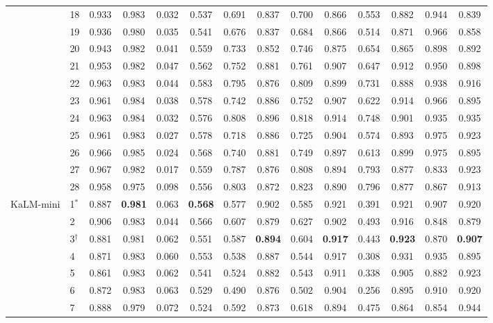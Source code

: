 \begin{table}[p]
\begin{tabular}{llcccccccccccc}
 & 18 & 0.933 & 0.983 & 0.032 & 0.537 & 0.691 & 0.837 & 0.700 & 0.866 & 0.553 & 0.882 & 0.944 & 0.839 \\
 & 19 & 0.936 & 0.980 & 0.035 & 0.541 & 0.676 & 0.837 & 0.684 & 0.866 & 0.514 & 0.871 & 0.966 & 0.858 \\
 & 20 & 0.943 & 0.982 & 0.041 & 0.559 & 0.733 & 0.852 & 0.746 & 0.875 & 0.654 & 0.865 & 0.898 & 0.892 \\
 & 21 & 0.953 & 0.982 & 0.047 & 0.562 & 0.752 & 0.881 & 0.761 & 0.907 & 0.647 & 0.912 & 0.950 & 0.898 \\
 & 22 & 0.963 & 0.983 & 0.044 & 0.583 & 0.795 & 0.876 & 0.809 & 0.899 & 0.731 & 0.888 & 0.938 & 0.916 \\
 & 23 & 0.961 & 0.984 & 0.038 & 0.578 & 0.742 & 0.886 & 0.752 & 0.907 & 0.622 & 0.914 & 0.966 & 0.895 \\
 & 24 & 0.963 & 0.984 & 0.032 & 0.576 & 0.808 & 0.896 & 0.818 & 0.914 & 0.748 & 0.901 & 0.935 & 0.935 \\
 & 25 & 0.961 & 0.983 & 0.027 & 0.578 & 0.718 & 0.886 & 0.725 & 0.904 & 0.574 & 0.893 & 0.975 & 0.923 \\
 & 26 & 0.966 & 0.985 & 0.024 & 0.568 & 0.740 & 0.881 & 0.749 & 0.897 & 0.613 & 0.899 & 0.975 & 0.895 \\
 & 27 & 0.967 & 0.982 & 0.017 & 0.559 & 0.787 & 0.876 & 0.808 & 0.894 & 0.793 & 0.877 & 0.833 & 0.923 \\
 & 28 & 0.958 & 0.975 & 0.098 & 0.556 & 0.803 & 0.872 & 0.823 & 0.890 & 0.796 & 0.877 & 0.867 & 0.913 \\
\midrule
KaLM-mini & 1$^{\ast}$ & 0.887 & \textbf{0.981} & 0.063 & \textbf{0.568} & 0.577 & 0.902 & 0.585 & 0.921 & 0.391 & 0.921 & 0.907 & 0.920 \\
 & 2 & 0.906 & 0.983 & 0.044 & 0.566 & 0.607 & 0.879 & 0.627 & 0.902 & 0.493 & 0.916 & 0.848 & 0.879 \\
 & 3$^{\dagger}$ & 0.881 & 0.981 & 0.062 & 0.551 & 0.587 & \textbf{0.894} & 0.604 & \textbf{0.917} & 0.443 & \textbf{0.923} & 0.870 & \textbf{0.907} \\
 & 4 & 0.871 & 0.983 & 0.060 & 0.553 & 0.538 & 0.887 & 0.544 & 0.917 & 0.308 & 0.931 & 0.935 & 0.895 \\
 & 5 & 0.861 & 0.983 & 0.062 & 0.541 & 0.524 & 0.882 & 0.543 & 0.911 & 0.338 & 0.905 & 0.882 & 0.923 \\
 & 6 & 0.872 & 0.983 & 0.063 & 0.529 & 0.490 & 0.876 & 0.502 & 0.904 & 0.256 & 0.895 & 0.910 & 0.920 \\
 & 7 & 0.888 & 0.979 & 0.072 & 0.524 & 0.592 & 0.873 & 0.618 & 0.894 & 0.475 & 0.864 & 0.854 & 0.944 \\

\end{tabular}
\end{table}
